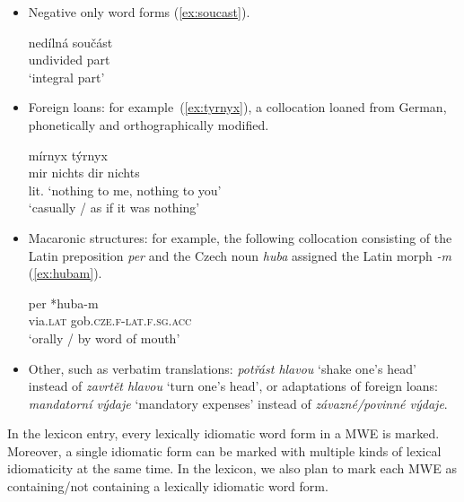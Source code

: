 \documentclass[output=paper,colorlinks,citecolor=brown]{langscibook}
\begin{document}
\begin{itemize}
    \item Negative only word forms (\ref{ex:soucast}).
    
    
\ea \label{ex:soucast}
\gll nedílná součást\\
     undivided part\\
\glt `integral part'
\z   

\end{itemize}

\begin{itemize}
    \item Foreign loans: for example\ (\ref{ex:tyrnyx}), a collocation loaned from German, phonetically and orthographically modified.
  
\ea \label{ex:tyrnyx}
\gll mírnyx týrnyx\\
     {mir nichts} {dir nichts}  \\
\glt lit. `nothing to me, nothing to you'\\
\glt `casually / as if it was nothing'
\z    

\end{itemize}

\begin{itemize}
    \item Macaronic structures: for example, the following collocation consisting of the Latin preposition \emph{per} and the Czech noun \emph{huba} assigned the Latin %
    morph \emph{-m} (\ref{ex:hubam}).
    
\ea \label{ex:hubam}
\gll per *huba-m\\
     via.\textsc{lat} gob.\textsc{cze.f}-\textsc{lat.f.sg.acc}\\
\glt `orally / by word of mouth'
\z

    \item Other, such as verbatim translations: \emph{potřást hlavou} ‘shake one's head’ instead of \emph{zavrtět hlavou} `turn one's head', or adaptations of foreign loans: \emph{mandatorní výdaje} ‘mandatory expenses’ instead of \emph{závazné/povinné výdaje}.


\end{itemize}


\noindent
In the lexicon entry, 
every lexically idiomatic word form in a MWE is marked. Moreover, a single idiomatic form can be marked with multiple kinds of lexical idiomaticity at the same time. In the lexicon, we also plan to mark each MWE as containing\slash not containing a lexically idiomatic word form.
\end{document}
